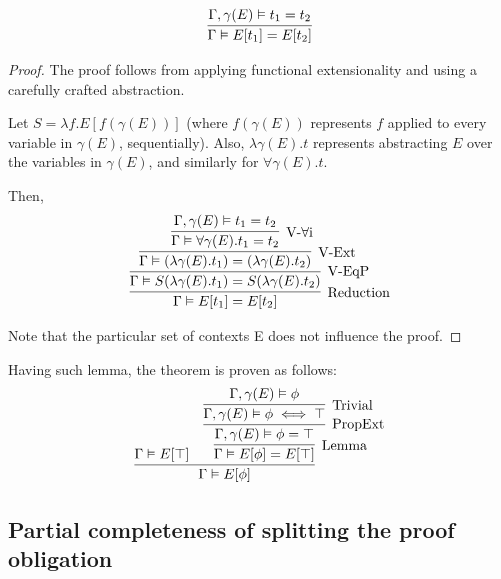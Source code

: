\begin{lemma}
    \[
    \infer{\Gamma \vDash E[t_1] = E[t_2]}
          {\Gamma, \gamma(E) \vDash t_1 = t_2}
    \]
\end{lemma}
\begin{proof}
    The proof follows from applying functional extensionality and using
    a carefully crafted abstraction.

    Let $S = \lambda f. E[f (\gamma(E))]$ (where $f (\gamma(E))$
    represents $f$ applied to every variable in $\gamma(E)$,
    sequentially). Also, $\lambda \gamma(E). t$ represents
    abstracting $E$ over the variables in $\gamma(E)$, and
    similarly for $\forall \gamma(E). t$.

    Then,
    \[
        \infer[\mbox{Reduction}]{\Gamma \vDash E[t_1] = E[t_2]}
        {\infer[\mbox{V-EqP}]{\Gamma \vDash S (\lambda \gamma(E). t_1) = S (\lambda \gamma(E). t_2)}
        {\infer[\mbox{V-Ext}]{\Gamma \vDash (\lambda \gamma(E). t_1) = (\lambda \gamma(E). t_2)}
        {\infer[\mbox{V-$\forall$i}]{\Gamma \vDash \forall \gamma(E). t_1 = t_2}
                             {\Gamma, \gamma(E) \vDash t_1 = t_2}}}}
    \]

    Note that the particular set of contexts E does not influence
    the proof.



\end{proof}

Having such lemma, the theorem is proven as follows:
\[
    \infer{\Gamma \vDash E[\phi]}
         {\Gamma \vDash E[\top]
         & \infer[\mbox{Lemma}]{\Gamma \vDash E[\phi] = E[\top]}{
         \infer[\mbox{PropExt}]{\Gamma, \gamma(E) \vDash \phi = \top}{
         \infer[\mbox{Trivial}]{\Gamma, \gamma(E) \vDash \phi \iff \top}
                               {\Gamma, \gamma(E) \vDash \phi}}}
         }
\]


\subsection{Partial completeness of splitting the proof obligation}

